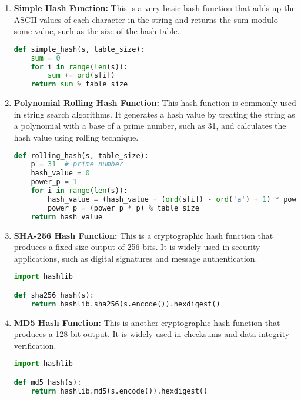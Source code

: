 \documentclass{article}
\begin{document}
\begin{enumerate}
	\item \textbf{Simple Hash Function:} This is a very basic hash function that adds up the ASCII values of each character in the string and returns the sum modulo some value, such as the size of the hash table.
		\begin{lstlisting}[language=Python]
			def simple_hash(s, table_size):
    sum = 0
    for i in range(len(s)):
        sum += ord(s[i])
    return sum % table_size

		\end{lstlisting}
	\item \textbf{Polynomial Rolling Hash Function:} This hash function is commonly used in string search algorithms. It generates a hash value by treating the string as a polynomial with a base of a prime number, such as 31, and calculates the hash value using rolling technique.
		\begin{lstlisting}[language=Python]
			def rolling_hash(s, table_size):
    p = 31  # prime number
    hash_value = 0
    power_p = 1
    for i in range(len(s)):
        hash_value = (hash_value + (ord(s[i]) - ord('a') + 1) * power_p) % table_size
        power_p = (power_p * p) % table_size
    return hash_value

		\end{lstlisting}
	\item \textbf{SHA-256 Hash Function:} This is a cryptographic hash function that produces a fixed-size output of 256 bits. It is widely used in security applications, such as digital signatures and message authentication.
		\begin{lstlisting}[language=Python]
			import hashlib

def sha256_hash(s):
    return hashlib.sha256(s.encode()).hexdigest()

		\end{lstlisting}
	\item \textbf{MD5 Hash Function:} This is another cryptographic hash function that produces a 128-bit output. It is widely used in checksums and data integrity verification.
		\begin{lstlisting}[language=Python]
			import hashlib

def md5_hash(s):
    return hashlib.md5(s.encode()).hexdigest()

		\end{lstlisting}
\end{enumerate}
\end{document}
